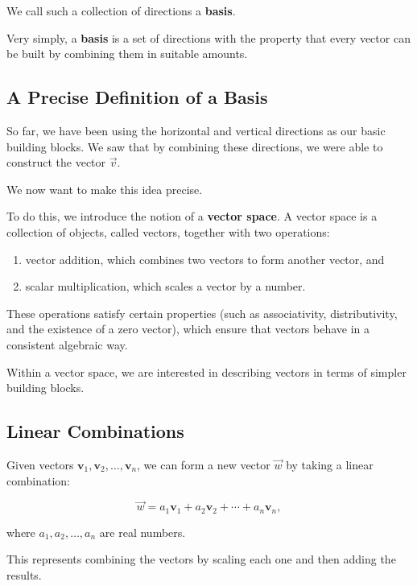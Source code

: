 \documentclass[11pt,openany]{book}
\theoremstyle{definition}
\begin{document}
We call such a collection of directions a \textbf{basis}.


Very simply, a \textbf{basis} is a set of directions with the property that every vector can be built by combining them in suitable amounts.


\subsection{A Precise Definition of a Basis}

So far, we have been using the horizontal and vertical directions as our basic building blocks. 
We saw that by combining these directions, we were able to construct the vector $\vec{v}$.

We now want to make this idea precise.

To do this, we introduce the notion of a \textbf{vector space}. 
A vector space is a collection of objects, called vectors, together with two operations:

\begin{enumerate}
  \item vector addition, which combines two vectors to form another vector, and
  \item scalar multiplication, which scales a vector by a number.
\end{enumerate}

These operations satisfy certain properties (such as associativity, distributivity, and the existence of a zero vector), 
which ensure that vectors behave in a consistent algebraic way.

\medskip

Within a vector space, we are interested in describing vectors in terms of simpler building blocks.

\subsection{Linear Combinations}

Given vectors $\mathbf{v}_1, \mathbf{v}_2, \dots, \mathbf{v}_n$, 
we can form a new vector $\vec{w}$ by taking a linear combination:

\[
\vec{w} = a_1 \mathbf{v}_1 + a_2 \mathbf{v}_2 + \cdots + a_n \mathbf{v}_n,
\]

where $a_1, a_2, \dots, a_n$ are real numbers.

This represents combining the vectors by scaling each one and then adding the results.

\medskip
\end{document}
